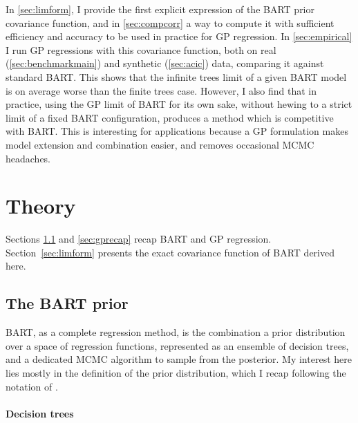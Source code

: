 \documentclass[a4paper]{article}
\theoremstyle{definition}
\begin{document}
    In \autoref{sec:limform}, I provide the first explicit expression of the BART prior covariance function, and in \autoref{sec:compcorr} a way to compute it with sufficient efficiency and accuracy to be used in practice for GP regression. In \autoref{sec:empirical} I run GP regressions with this covariance function, both on real (\autoref{sec:benchmarkmain}) and synthetic (\autoref{sec:acic}) data, comparing it against standard BART. This shows that the infinite trees limit of a given BART model is on average worse than the finite trees case. However, I also find that in practice, using the GP limit of BART for its own sake, without hewing to a strict limit of a fixed BART configuration, produces a method which is competitive with BART. This is interesting for applications because a GP formulation makes model extension and combination easier, and removes occasional MCMC headaches.

    \section{Theory}

    Sections \ref{sec:bart} and \ref{sec:gprecap} recap BART and GP regression. Section~\ref{sec:limform} presents the exact covariance function of BART derived here.
    
    \subsection{The BART prior}
    \label{sec:bart}
    
    BART, as a complete regression method, is the combination a prior distribution over a space of regression functions, represented as an ensemble of decision trees, and a dedicated MCMC algorithm to sample from the posterior. My interest here lies mostly in the definition of the prior distribution, which I recap following the notation of \textcite{chipman2010}.
    
    \paragraph{Decision trees}
\end{document}

